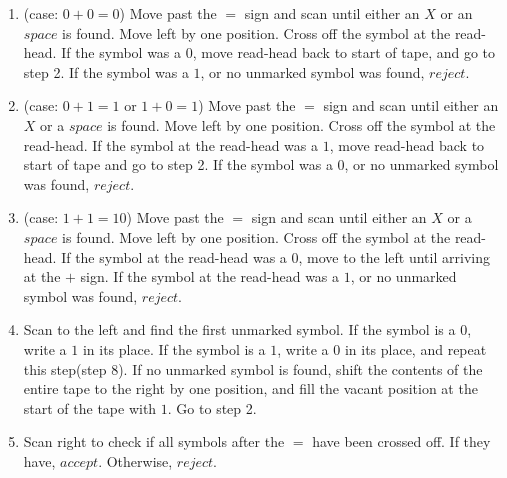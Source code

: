 \documentclass{article}
\begin{document}
\begin{enumerate}[\indent a)]
\begin{enumerate}[\indent 1.]
		\item (case: $0 + 0 = 0$) Move past the $=$ sign and scan until either an $X$ or an $space$ is found. Move left by one position. Cross off the symbol at the read-head. If the symbol was a $0$, move read-head back to start of tape, and go to step 2. If the symbol was a $1$, or no unmarked symbol was found, $reject$.
		
		\item (case: $0 + 1 = 1$ or $1 + 0 = 1$) Move past the $=$ sign and scan until either an $X$ or a $space$ is found. Move left by one position. Cross off the symbol at the read-head. If the symbol at the read-head was a $1$, move read-head back to start of tape and go to step 2. If the symbol was a $0$, or no unmarked symbol was found, $reject$.
		
		\item (case: $1 + 1 = 10$) Move past the $=$ sign and scan until either an $X$ or a $space$ is found. Move left by one position. Cross off the symbol at the read-head. If the symbol at the read-head was a $0$, move to the left until arriving at the $+$ sign. If the symbol at the read-head was a $1$, or no unmarked symbol was found, $reject$.
		
		\item Scan to the left and find the first unmarked symbol. If the symbol is a $0$, write a $1$ in its place. If the symbol is a $1$, write a $0$ in its place, and repeat this step(step 8). If no unmarked symbol is found, shift the contents of the entire tape to the right by one position, and fill the vacant position at the start of the tape with $1$. Go to step 2.
		
		\item Scan right to check if all symbols after the $=$ have been crossed off. If they have, $accept$. Otherwise, $reject$.
		 		
    \end{enumerate}



\end{enumerate}
\end{document}
